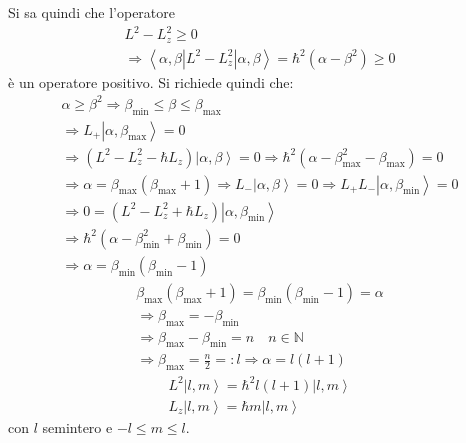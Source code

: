Si sa quindi che l'operatore
\begin{equation}\begin{split}
L^2-L_z^2 \ge 0 \\
\Longrightarrow \left\langle \alpha,\beta|L^2-L_z^2|\alpha,\beta \right\rangle=\hbar ^2\left(\alpha-\beta^2\right)\ge 0
\end{split}\end{equation}
è un operatore positivo. Si richiede quindi che:
\begin{equation}\begin{split}
\alpha\ge\beta^2 \Longrightarrow \beta_{\min}\le\beta\le\beta_{\max} \\
\Longrightarrow L_+\left |\alpha,\beta_{\max} \right\rangle=0 \\
\Longrightarrow \left(L^2-L_z^2-\hbar L_z\right)\left |\alpha,\beta \right\rangle=0
\Longrightarrow \hbar ^2\left(\alpha-\beta_{\max}^2-\beta_{\max}\right)=0 \\
\Longrightarrow \alpha=\beta_{\max}\left(\beta_{\max}+1\right)
\Longrightarrow L_-\left |\alpha,\beta \right\rangle=0 \Longrightarrow L_+L_-\left |\alpha,\beta_{\min} \right\rangle=0 \\
\Longrightarrow 0=\left(L^2-L_z^2+\hbar L_z\right)\left |\alpha,\beta_{\min} \right\rangle \\
\Longrightarrow \hbar ^2\left(\alpha-\beta_{\min}^2+\beta_{\min}\right)=0 \\
\Longrightarrow \alpha=\beta_{\min}\left(\beta_{\min}-1\right)
\end{split}\end{equation}
\begin{equation}\begin{split}
\beta_{\max}\left(\beta_{\max}+1\right)=\beta_{\min}\left(\beta_{\min}-1\right)=\alpha \\
\Longrightarrow \beta_{\max}=-\beta_{\min} \\
\Longrightarrow \beta_{\max}-\beta_{\min}=n \quad n\in\mathbb{N} \\
\Longrightarrow \beta_{\max}=\frac{n}{2}=:l \Longrightarrow \alpha=l\left(l+1\right)
\end{split}\end{equation}
\begin{equation}\begin{split}
L^2\left |l,m \right\rangle=\hbar ^2l\left(l+1\right)\left |l,m \right\rangle \\
L_z\left |l,m \right\rangle=\hbar m\left |l,m \right\rangle
\end{split}\end{equation}
con $l$ semintero e $-l\le m\le l$.

